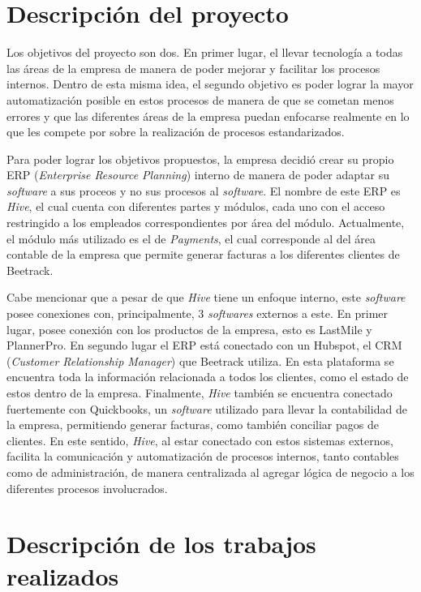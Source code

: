     
\section{Descripción del proyecto}

    Los objetivos del proyecto son dos. En primer lugar, el llevar tecnología a todas las áreas de la empresa de manera de poder mejorar y facilitar los procesos internos. Dentro de esta misma idea, el segundo objetivo es poder lograr la mayor automatización posible en estos procesos de manera de que se cometan menos errores y que las diferentes áreas de la empresa puedan enfocarse realmente en lo que les compete por sobre la realización de procesos estandarizados.
    
    Para poder lograr los objetivos propuestos, la empresa decidió crear su propio ERP (\textit{Enterprise Resource Planning}) interno de manera de poder adaptar su \textit{software} a sus proceos y no sus procesos al \textit{software}. El nombre de este ERP es \textit{Hive}, el cual cuenta con diferentes partes y módulos, cada uno con el acceso restringido a los empleados correspondientes por área del módulo. Actualmente, el módulo más utilizado es el de \textit{Payments}, el cual corresponde al del área contable de la empresa que permite generar facturas a los diferentes clientes de Beetrack.
    
    Cabe mencionar que a pesar de que \textit{Hive} tiene un enfoque interno, este \textit{software} posee conexiones con, principalmente, 3 \textit{softwares} externos a este. En primer lugar, posee conexión con los productos de la empresa, esto es LastMile y PlannerPro. En segundo lugar el ERP está conectado con un Hubspot, el CRM (\textit{Customer Relationship Manager}) que Beetrack utiliza. En esta plataforma se encuentra toda la información relacionada a todos los clientes, como el estado de estos dentro de la empresa. Finalmente, \textit{Hive} también se encuentra conectado fuertemente con Quickbooks, un \textit{software} utilizado para llevar la contabilidad de la empresa, permitiendo generar facturas, como también conciliar pagos de clientes. En este sentido, \textit{Hive}, al estar conectado con estos sistemas externos, facilita la comunicación y automatización de procesos internos, tanto contables como de administración, de manera centralizada al agregar lógica de negocio a los diferentes procesos involucrados.


\section{Descripción de los trabajos realizados}

